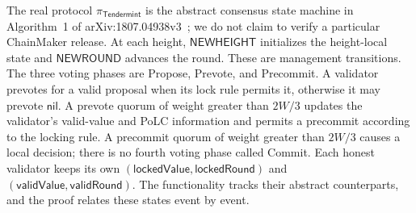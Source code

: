 \documentclass[conference,letterpaper,10pt]{IEEEtran}
\begin{document}
The real protocol $\pi_{\scriptscriptstyle\mathsf{Tendermint}}$ is the abstract consensus state machine in Algorithm~1 of arXiv:1807.04938v3~\cite{buchman2018latest}; we do not claim to verify a particular ChainMaker release. At each height, $\mathsf{NEWHEIGHT}$ initializes the height-local state and $\mathsf{NEWROUND}$ advances the round. These are management transitions. The three voting phases are Propose, Prevote, and Precommit. A validator prevotes for a valid proposal when its lock rule permits it, otherwise it may prevote $\mathsf{nil}$. A prevote quorum of weight greater than $2W/3$ updates the validator's valid-value and PoLC information and permits a precommit according to the locking rule. A precommit quorum of weight greater than $2W/3$ causes a local decision; there is no fourth voting phase called Commit. Each honest validator keeps its own $(\mathsf{lockedValue},\mathsf{lockedRound})$ and $(\mathsf{validValue},\mathsf{validRound})$. The functionality tracks their abstract counterparts, and the proof relates these states event by event.
\end{document}
